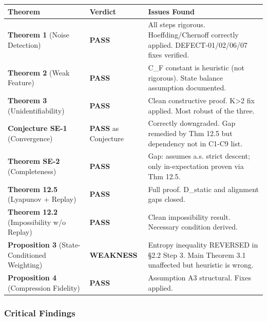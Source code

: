 \documentclass[
  12pt,
]{ctexart}
\begin{document}
\begin{longtable}[]{@{}
  >{\raggedright\arraybackslash}p{}
  >{\raggedright\arraybackslash}p{}
  >{\raggedright\arraybackslash}p{}@{}}
\toprule\noalign{}
\begin{minipage}[b]{\linewidth}\raggedright
Theorem
\end{minipage} & \begin{minipage}[b]{\linewidth}\raggedright
Verdict
\end{minipage} & \begin{minipage}[b]{\linewidth}\raggedright
Issues Found
\end{minipage} \\
\midrule\noalign{}
\endhead
\bottomrule\noalign{}
\endlastfoot
\textbf{Theorem 1} (Noise Detection) & \textbf{PASS} & All steps
rigorous. Hoeffding/Chernoff correctly applied. DEFECT-01/02/06/07 fixes
verified. \\
\textbf{Theorem 2} (Weak Feature) & \textbf{PASS} & C\_F constant is
heuristic (not rigorous). State balance assumption documented. \\
\textbf{Theorem 3} (Unidentifiability) & \textbf{PASS} & Clean
constructive proof. K\textgreater2 fix applied. Most robust of the
three. \\
\textbf{Conjecture SE-1} (Convergence) & \textbf{PASS} as Conjecture &
Correctly downgraded. Gap remedied by Thm 12.5 but dependency not in
C1-C9 list. \\
\textbf{Theorem SE-2} (Completeness) & \textbf{PASS} & Gap: assumes a.s.
strict descent; only in-expectation proven via Thm 12.5. \\
\textbf{Theorem 12.5} (Lyapunov + Replay) & \textbf{PASS} & Full proof.
D\_static and alignment gaps closed. \\
\textbf{Theorem 12.2} (Impossibility w/o Replay) & \textbf{PASS} & Clean
impossibility result. Necessary condition derived. \\
\textbf{Proposition 3} (State-Conditioned Weighting) & \textbf{WEAKNESS}
& Entropy inequality REVERSED in §2.2 Step 3. Main Theorem 3.1
unaffected but heuristic is wrong. \\
\textbf{Proposition 4} (Compression Fidelity) & \textbf{PASS} &
Assumption A3 structural. Fixes applied. \\
\end{longtable}

\subsubsection{Critical Findings}\label{critical-findings}
\end{document}
